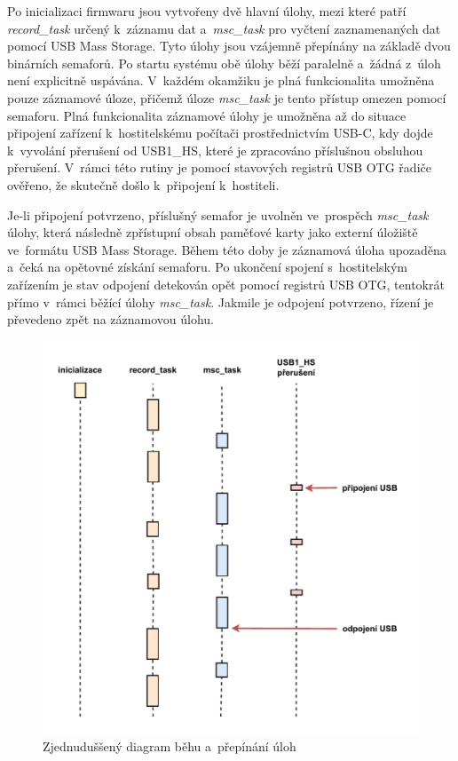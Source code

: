 Po inicializaci firmwaru jsou vytvořeny dvě hlavní úlohy, mezi které patří \textit{record\_task} určený k~záznamu dat a~\textit{msc\_task} pro vyčtení zaznamenaných dat pomocí USB Mass Storage. Tyto úlohy jsou vzájemně přepínány na základě dvou binárních semaforů. Po startu systému obě úlohy běží paralelně a~žádná z~úloh není explicitně uspávána. V~každém okamžiku je plná funkcionalita umožněna pouze záznamové úloze, přičemž úloze \textit{msc\_task} je tento přístup omezen pomocí semaforu. Plná funkcionalita záznamové úlohy je umožněna až do situace připojení zařízení k~hostitelskému počítači prostřednictvím USB-C, kdy dojde k~vyvolání přerušení od USB1\_HS, které je zpracováno příslušnou obsluhou přerušení. V~rámci této rutiny je pomocí stavových registrů USB OTG řadiče ověřeno, že skutečně došlo k~připojení k~hostiteli. 

\newpage

Je-li připojení potvrzeno, příslušný semafor je uvolněn ve~prospěch \textit{msc\_task} úlohy, která následně zpřístupní obsah paměťové karty jako externí úložiště ve~formátu USB Mass Storage. Během této doby je záznamová úloha upozaděna a~čeká na opětovné získání semaforu. Po ukončení spojení s~hostitelským zařízením je stav odpojení detekován opět pomocí registrů USB OTG, tentokrát přímo v~rámci běžící úlohy \textit{msc\_task}. Jakmile je odpojení potvrzeno, řízení je převedeno zpět na záznamovou úlohu.

\begin{figure}[h]
    \centering
    \includegraphics[width=1.00\textwidth]{obrazky-figures/run_wout_freertos-updated.pdf}
    
    \caption{Zjednuduššený diagram běhu a~přepínání úloh}
    \label{fig:application-run-freertos}
\end{figure}


